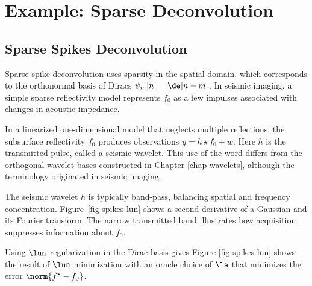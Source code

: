 \section{Example: Sparse Deconvolution}


                                                                
\subsection{Sparse Spikes Deconvolution}

Sparse spike deconvolution uses sparsity in the spatial domain, which corresponds to the orthonormal basis of Diracs $\psi_m[n] = \de[n-m]$. In seismic imaging, a simple sparse reflectivity model represents $f_0$ as a few impulses associated with changes in acoustic impedance.

In a linearized one-dimensional model that neglects multiple reflections, the subsurface reflectivity $f_0$ produces observations $y=h \star f_0 + w$. Here $h$ is the transmitted pulse, called a seismic wavelet. This use of the word differs from the orthogonal wavelet bases constructed in Chapter \ref{chap-wavelets}, although the terminology originated in seismic imaging.

The seismic wavelet $h$ is typically band-pass, balancing spatial and frequency concentration. Figure~\ref{fig-spikes-lun} shows a second derivative of a Gaussian and its Fourier transform. The narrow transmitted band illustrates how acquisition suppresses information about $f_0$.

            
                                  
      
                       
                     

Using $\lun$ regularization in the Dirac basis gives
Figure \ref{fig-spikes-lun} shows the result of $\lun$ minimization with an oracle choice of $\la$ that minimizes the error $\norm{f^\star-f_0}$.



